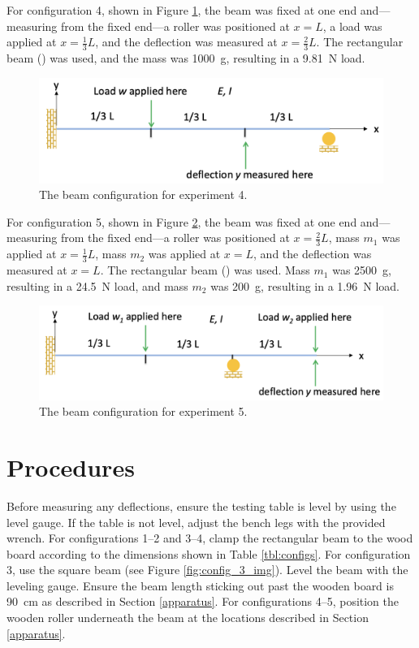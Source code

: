\documentclass[12 pt]{article}
\begin{document}
For configuration 4, shown in Figure \ref{fig:config_4}, the beam was fixed at one end and---measuring from the fixed end---a roller was positioned at $x=L$, a load was applied at $x=\frac{1}{3}L$, and the deflection was measured at $x=\frac{2}{3}L$. The rectangular beam () was used, and the mass was \qty{1000}{\g}, resulting in a \qty{9.81}{\N} load.

\begin{figure}[htbp]
\centering
\includegraphics[width=6in]{images/Config 4}
\caption{The beam configuration for experiment 4.}
\label{fig:config_4}
\end{figure}

For configuration 5, shown in Figure \ref{fig:config_5}, the beam was fixed at one end and---measuring from the fixed end---a roller was positioned at $x=\frac{2}{3}L$, mass $m_1$ was applied at $x=\frac{1}{3}L$, mass $m_2$ was applied at $x=L$, and the deflection was measured at $x=L$. The rectangular beam () was used. Mass $m_1$ was \qty{2500}{\g}, resulting in a \qty{24.5}{\N} load, and mass $m_2$ was \qty{200}{\g}, resulting in a \qty{1.96}{\N} load.

\begin{figure}[htbp]
\centering
\includegraphics[width=6in]{images/Config 5}
\caption{The beam configuration for experiment 5.}
\label{fig:config_5}
\end{figure}

\section{Procedures} \label{procedures}
Before measuring any deflections, ensure the testing table is level by using the level gauge. If the table is not level, adjust the bench legs with the provided wrench. For configurations 1--2 and 3--4, clamp the rectangular beam to the wood board according to the dimensions shown in Table \ref{tbl:configs}. For configuration \num{3}, use the square beam (see Figure \ref{fig:config_3_img}). Level the beam with the leveling gauge. Ensure the beam length sticking out past the wooden board is \qty{90}{\cm} as described in Section \ref{apparatus}. For configurations 4--5, position the wooden roller underneath the beam at the locations described in Section \ref{apparatus}.
\end{document}
